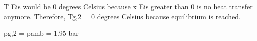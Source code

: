 T Eis would be 0 degrees Celsius because x Eis greater than 0 is no heat transfer anymore. Therefore, Tg,2 = 0 degrees Celsius because equilibrium is reached.  

pg,2 = pamb = 1.95 bar